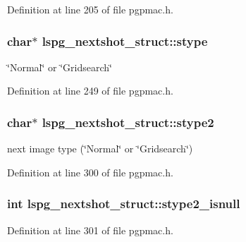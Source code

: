 Definition at line 205 of file pgpmac.\-h.

\hypertarget{structlspg__nextshot__struct_ab5a70b189c2fe516ca0c84bd06f3e564}{
\subsubsection[{stype}]{\setlength{\rightskip}{0pt plus 5cm}char$\ast$ lspg\-\_\-nextshot\-\_\-struct\-::stype}}\label{structlspg__nextshot__struct_ab5a70b189c2fe516ca0c84bd06f3e564}


\char`\"{}\-Normal\char`\"{} or \char`\"{}\-Gridsearch\char`\"{} 



Definition at line 249 of file pgpmac.\-h.

\hypertarget{structlspg__nextshot__struct_ae08ef74ea76e6e099a3ff6c7f845d337}{
\subsubsection[{stype2}]{\setlength{\rightskip}{0pt plus 5cm}char$\ast$ lspg\-\_\-nextshot\-\_\-struct\-::stype2}}\label{structlspg__nextshot__struct_ae08ef74ea76e6e099a3ff6c7f845d337}


next image type (\char`\"{}\-Normal\char`\"{} or \char`\"{}\-Gridsearch\char`\"{}) 



Definition at line 300 of file pgpmac.\-h.

\hypertarget{structlspg__nextshot__struct_a203e29ed0bb403aaab6d7f95f690cc0d}{
\subsubsection[{stype2\-\_\-isnull}]{\setlength{\rightskip}{0pt plus 5cm}int lspg\-\_\-nextshot\-\_\-struct\-::stype2\-\_\-isnull}}\label{structlspg__nextshot__struct_a203e29ed0bb403aaab6d7f95f690cc0d}


Definition at line 301 of file pgpmac.\-h.

